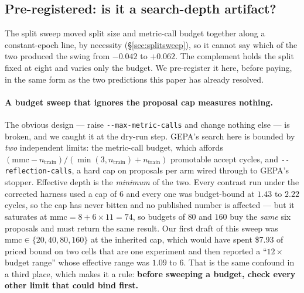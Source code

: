\documentclass[11pt]{article}
\begin{document}
\subsection{Pre-registered: is it a search-depth artifact?}
\label{sec:budgetprereg}

The split sweep moved split size and metric-call budget together along a constant-epoch line, by
necessity (\S\ref{sec:splitsweep}), so it cannot say which of the two produced the swing from
$-0.042$ to $+0.062$. The complement holds the split fixed at eight and varies only the budget.
We pre-register it here, before paying, in the same form as the two predictions this paper has
already resolved.

\paragraph{A budget sweep that ignores the proposal cap measures nothing.} The obvious design ---
raise \texttt{-{}-max-metric-calls} and change nothing else --- is broken, and we caught it at the
dry-run step. GEPA's search here is bounded by \emph{two} independent limits: the metric-call
budget, which affords $(\mathrm{mmc} - n_{\mathrm{train}})/(\min(3,
n_{\mathrm{train}}) + n_{\mathrm{train}})$ promotable accept cycles, and
\texttt{-{}-reflection-calls}, a hard cap on proposals per arm wired through to GEPA's stopper.
Effective depth is the \emph{minimum} of the two. Every contrast run under the corrected harness
used a cap of $6$ and every one was budget-bound at $1.43$ to $2.22$ cycles, so the cap has never
bitten and no published number is affected --- but it saturates at
$\mathrm{mmc} = 8 + 6 \times 11 = 74$, so budgets of $80$ and $160$ buy the \emph{same} six
proposals and must return the same result. Our first draft of this sweep was
$\mathrm{mmc} \in \{20,40,80,160\}$ at the inherited cap, which would have spent \$7.93 of priced
bound on two cells that are one experiment and then reported a ``$12\times$ budget range'' whose
effective range was $1.09$ to $6$. That is the same confound in a third place, which makes it a
rule: \textbf{before sweeping a budget, check every other limit that could bind first.}
\end{document}

